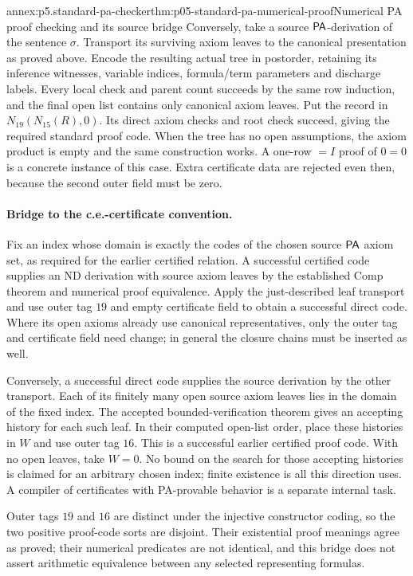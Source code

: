 \begin{annexitem}{annex:p5.standard-pa-checker}{thm:p05-standard-pa-numerical-proof}{Numerical PA proof checking and its source bridge}
Conversely, take a source \(\mathsf{PA}\)-derivation of the sentence \(\sigma\).
Transport its surviving axiom leaves to the canonical presentation as
proved above.  Encode the resulting actual tree in postorder, retaining
its inference witnesses, variable indices, formula/term parameters and
discharge labels.  Every local check and parent count succeeds by the
same row induction, and the final open list contains only canonical axiom
leaves.  Put the record in \(N_{19}(N_{15}(R),0)\).  Its direct axiom
checks and root check succeed, giving the required standard proof code.
When the tree has no open assumptions, the axiom product is empty and the
same construction works.  A one-row \(=I\) proof of \(0=0\) is a
concrete instance of this case.  Extra certificate data are rejected even
then, because the second outer field must be zero.

\paragraph{Bridge to the c.e.-certificate convention.}
Fix an index whose domain is exactly the codes of the chosen source
\(\mathsf{PA}\) axiom set, as required for the earlier certified relation.
A successful certified code supplies an ND derivation with source axiom
leaves by the established Comp theorem and numerical proof equivalence.
Apply the just-described leaf transport and use outer tag \(19\) and
empty certificate field to obtain a successful direct code.  Where its
open axioms already use canonical representatives, only the outer tag and
certificate field need change; in general the closure chains must be
inserted as well.

Conversely, a successful direct code supplies the source derivation by
the other transport.  Each of its finitely many open source axiom leaves
lies in the domain of the fixed index.  The accepted bounded-verification
theorem gives an accepting history for each such leaf.  In their computed
open-list order, place these histories in \(W\) and use outer tag \(16\).
This is a successful earlier certified proof code.  With no open leaves,
take \(W=0\).  No bound on the search for those accepting histories is
claimed for an arbitrary chosen index; finite existence is all this direction
uses.  A compiler of certificates with PA-provable behavior is a separate
internal task.

Outer tags \(19\) and \(16\) are distinct under the injective constructor
coding, so the two positive proof-code sorts are disjoint.  Their existential
proof meanings agree as proved; their numerical predicates are not identical,
and this bridge does not assert arithmetic equivalence between any selected
representing formulas.


\end{annexitem}

